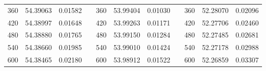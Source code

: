 \begin{table}[]
\begin{tabular}{ccccccccccc}
\multicolumn{1}{|c|}{360}         & \multicolumn{1}{c|}{54.39063} & \multicolumn{1}{c|}{0.01582}        & \multicolumn{1}{c|}{} & \multicolumn{1}{c|}{360}         & \multicolumn{1}{c|}{53.99404} & \multicolumn{1}{c|}{0.01030}        & \multicolumn{1}{c|}{} & \multicolumn{1}{c|}{360}         & \multicolumn{1}{c|}{52.28070} & \multicolumn{1}{c|}{0.02096}        \\ \cline{1-3} \cline{5-7} \cline{9-11} 
\multicolumn{1}{|c|}{420}         & \multicolumn{1}{c|}{54.38997} & \multicolumn{1}{c|}{0.01648}        & \multicolumn{1}{c|}{} & \multicolumn{1}{c|}{420}         & \multicolumn{1}{c|}{53.99263} & \multicolumn{1}{c|}{0.01171}        & \multicolumn{1}{c|}{} & \multicolumn{1}{c|}{420}         & \multicolumn{1}{c|}{52.27706} & \multicolumn{1}{c|}{0.02460}        \\ \cline{1-3} \cline{5-7} \cline{9-11} 
\multicolumn{1}{|c|}{480}         & \multicolumn{1}{c|}{54.38880} & \multicolumn{1}{c|}{0.01765}        & \multicolumn{1}{c|}{} & \multicolumn{1}{c|}{480}         & \multicolumn{1}{c|}{53.99150} & \multicolumn{1}{c|}{0.01284}        & \multicolumn{1}{c|}{} & \multicolumn{1}{c|}{480}         & \multicolumn{1}{c|}{52.27485} & \multicolumn{1}{c|}{0.02681}        \\ \cline{1-3} \cline{5-7} \cline{9-11} 
\multicolumn{1}{|c|}{540}         & \multicolumn{1}{c|}{54.38660} & \multicolumn{1}{c|}{0.01985}        & \multicolumn{1}{c|}{} & \multicolumn{1}{c|}{540}         & \multicolumn{1}{c|}{53.99010} & \multicolumn{1}{c|}{0.01424}        & \multicolumn{1}{c|}{} & \multicolumn{1}{c|}{540}         & \multicolumn{1}{c|}{52.27178} & \multicolumn{1}{c|}{0.02988}        \\ \cline{1-3} \cline{5-7} \cline{9-11} 
\multicolumn{1}{|c|}{600}         & \multicolumn{1}{c|}{54.38465} & \multicolumn{1}{c|}{0.02180}        & \multicolumn{1}{c|}{} & \multicolumn{1}{c|}{600}         & \multicolumn{1}{c|}{53.98912} & \multicolumn{1}{c|}{0.01522}        & \multicolumn{1}{c|}{} & \multicolumn{1}{c|}{600}         & \multicolumn{1}{c|}{52.26859} & \multicolumn{1}{c|}{0.03307}        \\ \cline{1-3} \cline{5-7} \cline{9-11} 
\end{tabular}
\end{table}

